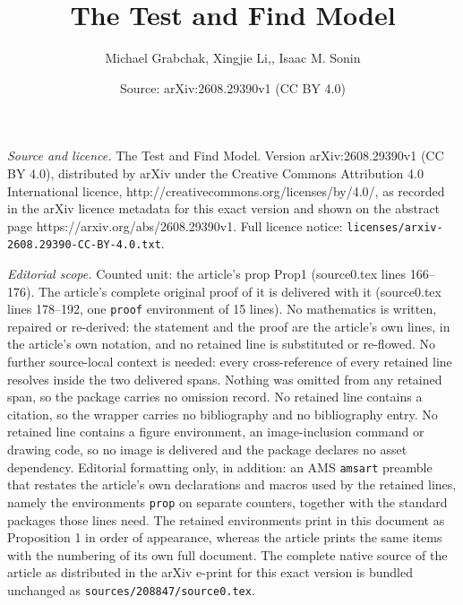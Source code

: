 \documentclass[10pt,a4paper]{amsart}
\title{The Test and Find Model}
\author{Michael Grabchak, Xingjie Li,, Isaac M. Sonin}
\date{Source: arXiv:2608.29390v1 (CC BY 4.0)}
\begin{document}
\maketitle

\noindent\emph{Source and licence.} The Test and Find Model. Version arXiv:2608.29390v1 (CC BY 4.0), distributed by arXiv under the Creative Commons Attribution 4.0 International licence, http://creativecommons.org/licenses/by/4.0/, as recorded in the arXiv licence metadata for this exact version and shown on the abstract page https://arxiv.org/abs/2608.29390v1. Full licence notice: \texttt{licenses/arxiv-2608.29390-CC-BY-4.0.txt}.\par\smallskip

\noindent\textit{Editorial scope.} Counted unit: the article's prop Prop1 (source0.tex lines 166--176). The article's complete original proof of it is delivered with it (source0.tex lines 178--192, one \texttt{proof} environment of 15 lines). No mathematics is written, repaired or re-derived: the statement and the proof are the article's own lines, in the article's own notation, and no retained line is substituted or re-flowed.  No further source-local context is needed: every cross-reference of every retained line resolves inside the two delivered spans.  Nothing was omitted from any retained span, so the package carries no omission record.  No retained line contains a citation, so the wrapper carries no bibliography and no bibliography entry.  No retained line contains a figure environment, an image-inclusion command or drawing code, so no image is delivered and the package declares no asset dependency.  Editorial formatting only, in addition: an AMS \texttt{amsart} preamble that restates the article's own declarations and macros used by the retained lines, namely the environments \texttt{prop} on separate counters, together with the standard packages those lines need.  The retained environments print in this document as Proposition 1 in order of appearance, whereas the article prints the same items with the numbering of its own full document.  The complete native source of the article as distributed in the arXiv e-print for this exact version is bundled unchanged as \texttt{sources/208847/source0.tex}.
\end{document}
